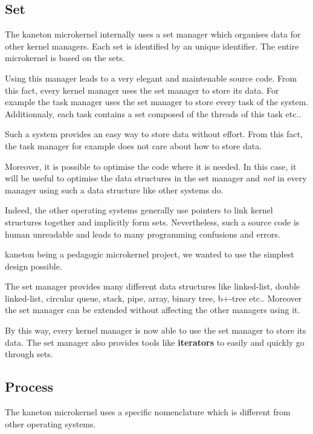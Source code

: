 \begin{multicols}{2}
%
%

\subsection{Set}

The kaneton microkernel internally uses a set manager which organises data
for other kernel managers. Each set is identified by an unique identifier.
The entire microkernel is based on the sets.

Using this manager leads to a very elegant and maintenable source code. From
this fact, every kernel manager uses the set manager to store its data. For
example the task manager uses the set manager to store every task of the
system. Additionnaly, each task contains a set composed of the threads of
this task etc..

Such a system provides an easy way to store data without effort. From this
fact, the task manager for example does not care about how to store data.

Moreover, it is possible to optimise the code where it is needed. In this
case, it will be useful to optimise the data structures in the set manager
and \textit{not} in every manager using such a data structure like
other systems do.

Indeed, the other operating systems generally use pointers to link kernel
structures together and implicitly form sets. Nevertheless, such a source code
is human unreadable and leads to many programming confusions and errors.

kaneton being a pedagogic microkernel project, we wanted to use the simplest
design possible.

The set manager provides many different data structures like linked-list,
double linked-list, circular queue, stack, pipe, array, binary tree, b+-tree
etc.. Moreover the set manager can be extended without affecting the other
managers using it.

By this way, every kernel manager is now able to use the set manager to
store its data. The set manager also provides tools like \textbf{iterators}
to easily and quickly go through sets.

%
%

\subsection{Process}

The kaneton microkernel uses a specific nomenclature which is different
from other operating systems.


\end{multicols}
